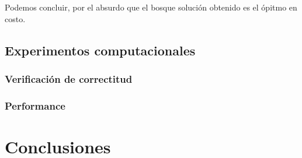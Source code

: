 \documentclass[a4paper, 10pt, twoside]{article}
\begin{document}
Podemos concluir, por el absurdo que el bosque solución obtenido es el ópitmo en costo.

\subsection{Experimentos computacionales}

\subsubsection{Verificación de correctitud}

\subsubsection{Performance}





\newpage

\section{Conclusiones}






\newpage
\end{document}
